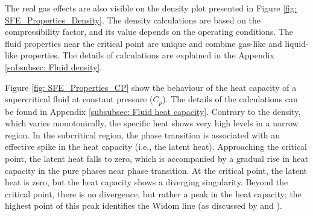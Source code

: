 \documentclass[../Article_Model_Parameters.tex]{subfiles}
\begin{document}
	The real gas effects are also visible on the density plot presented in Figure \ref{fig: SFE_Properties_Density}. The density calculations are based on the compressibility factor, and its value depends on the operating conditions. The fluid properties near the critical point are unique and combine gas-like and liquid-like properties. The details of calculations are explained in the Appendix \ref{subsubsec: Fluid density}.
	
	Figure \ref{fig: SFE_Properties_CP} show the behaviour of the heat capacity of a supercritical fluid at constant pressure ($C_p$). The details of the calculations can be found in Appendix \ref{subsubsec: Fluid heat capacity}. Contrary to the density, which varies monotonically, the specific heat shows very high levels in a narrow region. In the subcritical region, the phase transition is associated with an effective spike in the heat capacity (i.e., the latent heat). Approaching the critical point, the latent heat falls to zero, which is accompanied by a gradual rise in heat capacity in the pure phases near phase transition. At the critical point, the latent heat is zero, but the heat capacity shows a diverging singularity. Beyond the critical point, there is no divergence, but rather a peak in the heat capacity; the highest point of this peak identifies the Widom line (as discussed by \citet{Simeoni2010} and \citet{Banuti2019}).
		
\end{document}

